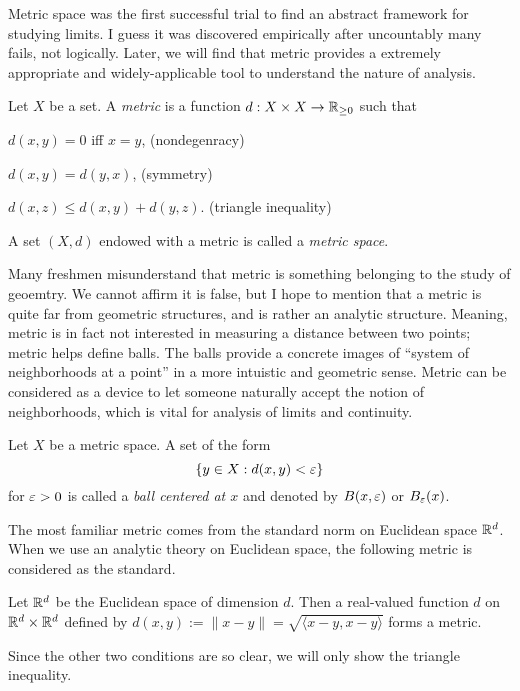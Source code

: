 \documentclass{../crs}
\begin{document}
Metric space was the first successful trial to find an abstract framework for studying limits.
I guess it was discovered empirically after uncountably many fails, not logically.
Later, we will find that metric provides a extremely appropriate and widely-applicable tool to understand the nature of analysis.

\begin{defn}
Let $X$ be a set.
A \emph{metric} is a function $d:X\x X\to\R_{\ge0}$ such that
\begin{cond}
\item $d(x,y)=0$ iff $x=y$, \hfill(nondegenracy)
\item $d(x,y)=d(y,x)$, \hfill(symmetry)
\item $d(x,z)\le d(x,y)+d(y,z)$. \hfill(triangle inequality)
\end{cond}
A set $(X,d)$ endowed with a metric is called a \emph{metric space}.
\end{defn}



Many freshmen misunderstand that metric is something belonging to the study of geoemtry.
We cannot affirm it is false, but I hope to mention that a metric is quite far from geometric structures, and is rather an analytic structure.
Meaning, metric is in fact not interested in measuring a distance between two points; metric helps define balls.
The balls provide a concrete images of ``system of neighborhoods at a point'' in a more intuistic and geometric sense.
Metric can be considered as a device to let someone naturally accept the notion of neighborhoods, which is vital for analysis of limits and continuity.
\begin{defn}
Let $X$ be a metric space.
A set of the form 
\[\{y\in X:d(x,y)<\varepsilon\}\]
for $\varepsilon>0$ is called a \emph{ball centered at $x$} and denoted by $B(x,\varepsilon)$ or $B_\varepsilon(x)$.
\end{defn}
The most familiar metric comes from the standard norm on Euclidean space $\mathbb{R}^d$.
When we use an analytic theory on Euclidean space, the following metric is considered as the standard.
\begin{ex}
Let $\mathbb{R}^d$ be the Euclidean space of dimension $d$.
Then a real-valued function $d$ on $\mathbb{R}^d\times\mathbb{R}^d$ defined by $d(x,y):=\|x-y\|=\sqrt{\langle x-y,x-y\rangle}$ forms a metric.
\end{ex}
\begin{pf}
Since the other two conditions are so clear, we will only show the triangle inequality.

\end{pf}
\end{document}

